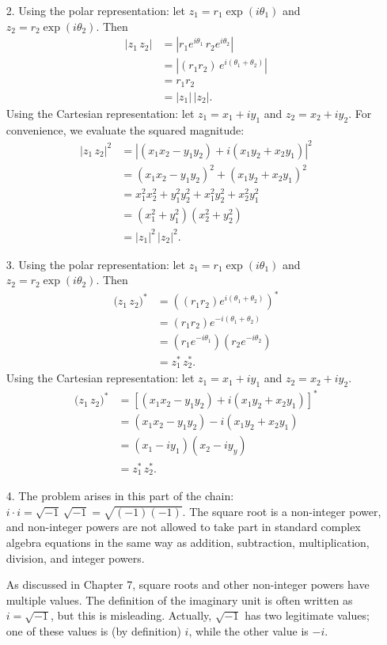 \documentclass[10pt,a4paper]{article}
\begin{document}
\begin{enumerate}
\item[2.]
Using the polar representation: let $z_1 = r_1 \exp(i\theta_1)$ and
$z_2 = r_2 \exp(i\theta_2)$. Then
\begin{align}
  \big|z_1\, z_2\big| &= \left|r_1 e^{i\theta_1} \, r_2 e^{i\theta_2}\right| \\
  &= \left|(r_1r_2)\,e^{i(\theta_1+\theta_2)}\right| \\
  &= r_1 r_2 \\
  &= |z_1|\, |z_2|.
\end{align}
Using the Cartesian representation: let $z_1 = x_1+iy_1$ and $z_2 =
x_2+iy_2$. For convenience, we evaluate the squared magnitude:
\begin{align}
  \big|z_1\, z_2\big|^2 &= \left|(x_1x_2 - y_1y_2) + i (x_1y_2+x_2y_1)\right|^2 \\
  &= (x_1x_2 - y_1y_2)^2 + (x_1y_2+x_2y_1)^2 \\
  &= x_1^2x_2^2 + y_1^2 y_2^2 + x_1^2y_2^2 + x_2^2 y_1^2 \\
  &= \left(x_1^2 + y_1^2\right)\left(x_2^2 + y_2^2\right) \\
  &= |z_1|^2 \, |z_2|^2.
\end{align}

\item[3.] Using the polar representation: let $z_1 = r_1
  \exp(i\theta_1)$ and $z_2 = r_2 \exp(i\theta_2)$. Then
\begin{align}\big(z_1\, z_2\big)^* &= \left(\left(r_1r_2\right) e^{i(\theta_1+\theta_2)}\right)^* \\ &= \left(r_1r_2\right) e^{-i(\theta_1+\theta_2)} \\
  &= \left(r_1 e^{-i\theta_1}\right) \left(r_2 e^{-i\theta_2}\right) \\
  &= z_1^* \, z_2^*.
\end{align}
Using the Cartesian representation: let $z_1 = x_1+iy_1$ and
$z_2 = x_2+iy_2$.
\begin{align}\big(z_1\, z_2\big)^* &= \left[\left(x_1x_2 - y_1y_2\right) + i \left(x_1y_2+x_2y_1\right)\right]^* \\
  &= \left(x_1x_2 - y_1y_2\right) - i \left(x_1y_2+x_2y_1\right) \\
  &= \left(x_1 - iy_1\right) \left(x_2 - iy_y\right) \\
  &= z_1^* \, z_2^*.
\end{align}

\item[4.]
The problem arises in this part of the chain: $i\cdot i =
\sqrt{-1}\,\sqrt{-1} = \sqrt{(-1)(-1)}$. The square root is a
non-integer power, and non-integer powers are not allowed to take part
in standard complex algebra equations in the same way as addition,
subtraction, multiplication, division, and integer powers.

As discussed in Chapter 7, square roots and other non-integer powers
have multiple values. The definition of the imaginary unit is often
written as $i = \sqrt{-1}$, but this is misleading. Actually,
$\sqrt{-1}$ has two legitimate values; one of these values is (by
definition) $i$, while the other value is $-i$.
\end{enumerate}
\end{document}
